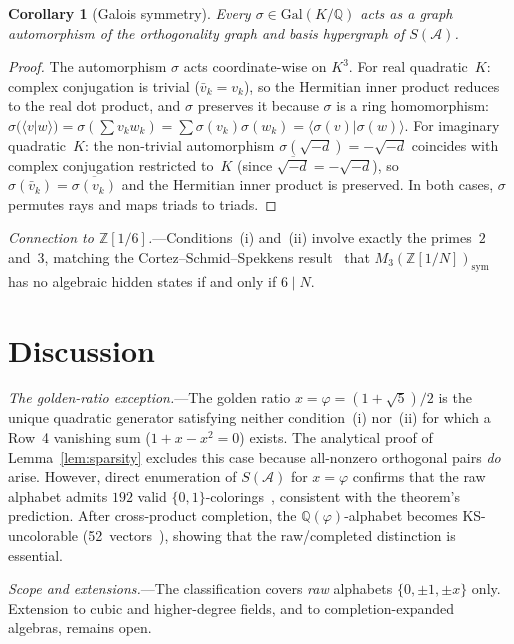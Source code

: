 \documentclass[12pt,a4paper]{article}
\newtheorem{corollary}{Corollary}
\newcommand{\Z}{\mathbb{Z}}
\newcommand{\Q}{\mathbb{Q}}
\newcommand{\Gal}{\mathrm{Gal}}
\newcommand{\braket}[2]{\langle #1 | #2 \rangle}
\begin{document}
\begin{corollary}[Galois symmetry]\label{cor:galois}
Every $\sigma \in \Gal(K/\Q)$ acts as a graph automorphism of
the orthogonality graph and basis hypergraph of $S(\mathcal{A})$.
\end{corollary}

\begin{proof}
The automorphism $\sigma$ acts coordinate-wise on $K^3$.  For real
quadratic~$K$: complex conjugation is trivial ($\bar{v}_k = v_k$),
so the Hermitian inner product reduces to the real dot product, and
$\sigma$ preserves it because $\sigma$ is a ring homomorphism:
$\sigma(\braket{v}{w}) = \sigma(\sum v_k w_k) = \sum \sigma(v_k)
\sigma(w_k) = \braket{\sigma(v)}{\sigma(w)}$.  For imaginary quadratic~$K$: the
non-trivial automorphism $\sigma(\sqrt{-d}) = -\sqrt{-d}$ coincides
with complex conjugation restricted to~$K$ (since
$\overline{\sqrt{-d}} = -\sqrt{-d}$), so $\sigma(\bar{v}_k) =
\overline{\sigma(v_k)}$ and the Hermitian inner product is preserved.
In both cases, $\sigma$ permutes rays and maps triads to triads.
\end{proof}

\smallskip\noindent\textit{Connection to $\Z[1/6]$.}---Conditions~(i)
and~(ii) involve exactly the primes~$2$ and~$3$, matching the
Cortez--Schmid--Spekkens result~\cite{CortezMoralesReyes2022} that
$M_3(\Z[1/N])_{\mathrm{sym}}$ has no algebraic hidden states if and
only if $6 \mid N$.

\section{Discussion}\label{sec:discussion}

\textit{The golden-ratio exception.}---The golden ratio
$x = \varphi = (1{+}\sqrt{5})/2$ is the unique quadratic generator
satisfying neither condition~(i) nor~(ii) for which a Row~4 vanishing
sum ($1 + x - x^2 = 0$) exists.  The analytical proof of
Lemma~\ref{lem:sparsity} excludes this case because all-nonzero
orthogonal pairs \emph{do} arise.  However, direct enumeration of
$S(\mathcal{A})$ for $x = \varphi$ confirms that the raw alphabet
admits $192$ valid $\{0,1\}$-colorings~\cite{Kernaghan2026islands},
consistent with the theorem's prediction.  After cross-product
completion, the $\Q(\varphi)$-alphabet becomes KS-uncolorable
(52~vectors~\cite{Kernaghan2026islands}), showing that the raw/completed
distinction is essential.

\textit{Scope and extensions.}---The classification covers \emph{raw}
alphabets $\{0,\pm 1,\pm x\}$ only.  Extension to cubic and
higher-degree fields, and to completion-expanded algebras, remains open.
\end{document}
